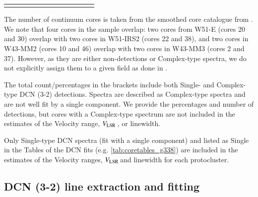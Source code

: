 \documentclass[longauth]{aa} %
\newcommand{\vlsr}{\mbox{$V_{\rm LSR}$\,}}
\begin{document}
\begin{table}[htbp!]
\begin{threeparttable}[c]
\begin{tabular}{lllllllllllll}
\hline \noalign {\smallskip}
\end{tabular}
\begin{tablenotes}
\item[1] The number of continuum cores is taken from the smoothed core catalogue from \citet{louvet22}. We note that four cores in the sample overlap: two cores from W51-E (cores 20 and 30) overlap with two cores in W51-IRS2 (cores 22 and 38), and two cores in W43-MM2 (cores 10 and 46) overlap with two cores in W43-MM3 (cores 2 and 37). However, as they are either non-detections or Complex-type spectra, we do not explicitly assign them to a given field as done in \citet{louvet22}. 
\item[2] The total count/percentages in the brackets include both Single- and Complex-type DCN (3-2) detections. Spectra are described as Complex-type spectra and are not well fit by a single component. We provide the percentages and number of detections, but cores with a Complex-type spectrum are not included in the estimates of the Velocity range, \vlsr, or linewidth.
\item[3] Only Single-type DCN spectra (fit with a single component) and listed as Single in the Tables of the DCN fits (e.g. \cref{tab:coretables_g338}) are included in the estimates of the Velocity ranges, \vlsr and linewidth for each protocluster. 
%
%

\end{tablenotes}
\end{threeparttable}
\end{table}

\subsection{DCN (3-2) line extraction and fitting}
\end{document}
